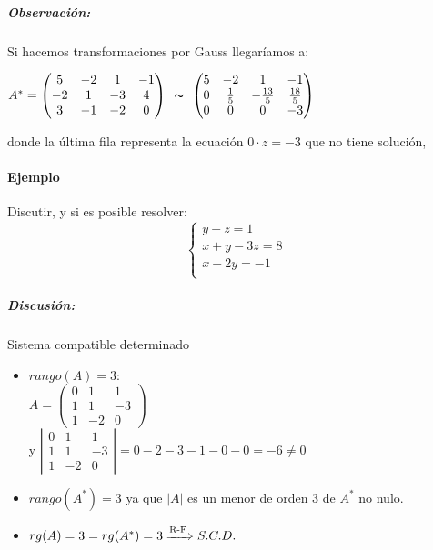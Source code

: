 \subparagraph{Observación:}

Si hacemos transformaciones por Gauss llegaríamos a:

$A^*=\left(\begin{matrix}5 & -2 & 1 & -1\\-2 & 1 & -3 & 4\\3 & -1 & -2 & 0\end{matrix}\right)\begin{array}{c}
     \thicksim   \\
     
    \end{array}
    \left(\begin{matrix}5 & -2 & 1 & -1\\0 & \frac{1}{5} & - \frac{13}{5} & \frac{18}{5}\\0 & 0 & 0 & -3\end{matrix}\right)$
    
    donde la última fila representa la ecuación $0\cdot z = -3$ que no tiene solución, 

 \paragraph{Ejemplo}
 
Discutir, y si es posible resolver:
$$\left\{ \begin{matrix}y + z = 1 \\ x + y - 3 z = 8 \\ x - 2 y = -1 \\ \end{matrix}\right.$$
\subparagraph{Discusión:} Sistema compatible determinado
\begin{itemize}
    \item $rango(A) =3$: \\  $A=\left(\begin{matrix}0 & 1 & 1\\1 & 1 & -3\\1 & -2 & 0\end{matrix}\right)$ \\ y $\left|\begin{matrix}0 & 1 & 1\\1 & 1 & -3\\1 & -2 & 0\end{matrix}\right| = 0-2-3-1-0-0=-6\neq0 $ 
    \item $rango(A^*) =3$ ya que $\left|A\right|$ es un menor de orden 3 de $A^*$ no nulo. 
    
    \item $rg(A)=3=rg(A^*)=3 \xRightarrow{\text{R-F}} S.C.D. $
\end{itemize}

